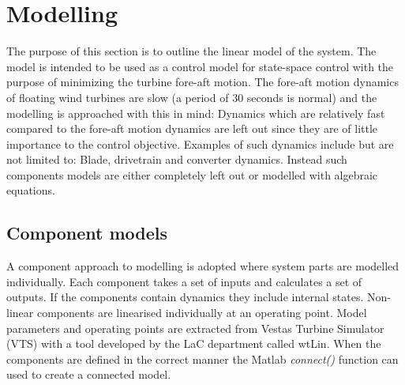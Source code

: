 \section{Modelling} \label{sec:mod} %
The purpose of this section is to outline the linear model of the system. The model is intended to be used as a control model for state-space control with the purpose of minimizing the turbine fore-aft motion. The fore-aft motion dynamics of floating wind turbines are slow (a period of 30 seconds is normal) and the modelling is approached with this in mind: Dynamics which are relatively fast compared to the fore-aft motion dynamics are left out since they are of little importance to the control objective. Examples of such dynamics include but are not limited to: Blade, drivetrain and converter dynamics. Instead such components models are either completely left out or modelled with algebraic equations. 




%
%


\subsection{Component models} \label{sec:comp}
A component approach to modelling is adopted where system parts are modelled individually. Each component takes a set of inputs and calculates a set of outputs. If the components contain dynamics they include internal states. Non-linear components are linearised individually at an operating point. Model parameters and operating points are extracted from Vestas Turbine Simulator (VTS) with a tool developed by the LaC department called wtLin. When the components are defined in the correct manner the Matlab \textit{connect()} function can used to create a connected model.

